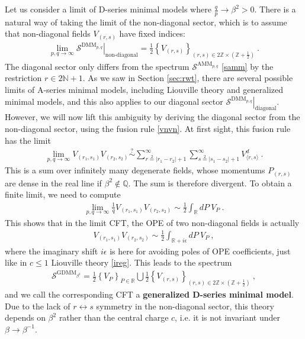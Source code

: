 \documentclass[12pt, a4paper]{article}
\theoremstyle{break}
\begin{document}
Let us consider a limit of D-series minimal models where $\frac{q}{p}\to \beta^2>0$. There is a natural way of taking the limit of the non-diagonal sector, which is to assume that non-diagonal fields $V_{(r,s)}$ have fixed indices:
\begin{align}
 \lim_{p,q\to\infty} \left. \mathcal{S}^{\text{DMM}_{p,q}} \right|_{\text{non-diagonal}} = 
 \frac12\left\{V_{(r,s)} \right\}_{ (r,s)\in 2\mathbb{Z}\times (\mathbb{Z}+\frac12)}\ .
\end{align}
The diagonal sector only differs from the spectrum $\mathcal{S}^{\text{AMM}_{p,q}}$ \eqref{samm} by the restriction $r\in 2\mathbb{N}+1$. 
As we saw in Section \ref{sec:rwt}, there are several possible limits of A-series minimal models, including Liouville theory and generalized minimal models, and this also applies to our diagonal sector $\left. \mathcal{S}^{\text{DMM}_{p,q}} \right|_{\text{diagonal}} $. However, we will now lift this ambiguity by deriving the diagonal sector from the non-diagonal sector, using the fusion rule \eqref{vnvn}. At first sight, this fusion rule has the limit  
\begin{align}
 \lim_{p,q\to\infty} V_{(r_1,s_1)} V_{(r_2,s_2)}  \overset{?}{\sim} \sum_{r\overset{2}{=}|r_1-r_2|+1}^{\infty} \sum_{s\overset{2}{=}|s_1-s_2|+1}^{\infty} V^d_{\langle r,s\rangle}\ .
\end{align}
This is a sum over infinitely many degenerate fields, whose momentums $P_{(r,s)}$ are dense in the real line if $\beta^2\notin \mathbb{Q}$. The sum is therefore divergent. To obtain a finite limit, we need to compute 
\begin{align}
 \lim_{p,q\to\infty} \frac{1}{q} V_{(r_1,s_1)} V_{(r_2,s_2)} \sim \frac12 \int_\mathbb{R} dP \ V_P\ .
\end{align}
This shows that in the limit CFT, the OPE of two non-diagonal fields is actually 
\begin{align}
 V_{(r_1,s_1)}V_{(r_2,s_2)} \sim \frac12 \int_{\mathbb{R}+i\epsilon} dP\ V_P\ ,
 \label{vrsvrs}
\end{align}
where the imaginary shift $i\epsilon$ is here for avoiding poles of OPE coefficients, just like in $c\leq 1$ Liouville theory \eqref{ireg}. This leads to the spectrum
\begin{align}
\boxed{\mathcal{S}^{\text{GDMM}_{\beta^2}} = \frac12 \left\{V_P\right\}_{P\in \mathbb{R}} \bigcup  \frac12\left\{V_{(r,s)} \right\}_{ (r,s)\in 2\mathbb{Z}\times (\mathbb{Z}+\frac12)}  }\ ,
\end{align}
and we call the corresponding CFT a \textbf{generalized D-series minimal model}. Due to the lack of $r\leftrightarrow s$ symmetry in the non-diagonal sector, this theory depends on $\beta^2$ rather than the central charge $c$, i.e. it is not invariant under $\beta \to \beta^{-1}$. 
\end{document}

